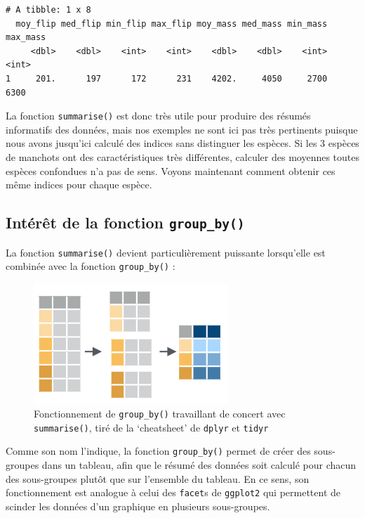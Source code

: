 \documentclass[
  a4paper,
  DIV=11,
  numbers=noendperiod,
  oneside]{scrreprt}
\begin{document}
\begin{verbatim}
# A tibble: 1 x 8
  moy_flip med_flip min_flip max_flip moy_mass med_mass min_mass max_mass
     <dbl>    <dbl>    <int>    <int>    <dbl>    <dbl>    <int>    <int>
1     201.      197      172      231    4202.     4050     2700     6300
\end{verbatim}

La fonction \texttt{summarise()} est donc très utile pour produire des
résumés informatifs des données, mais nos exemples ne sont ici pas très
pertinents puisque nous avons jusqu'ici calculé des indices sans
distinguer les espèces. Si les 3 espèces de manchots ont des
caractéristiques très différentes, calculer des moyennes toutes espèces
confondues n'a pas de sens. Voyons maintenant comment obtenir ces même
indices pour chaque espèce.

\hypertarget{intuxe9ruxeat-de-la-fonction-group_by}{%
\subsection{\texorpdfstring{Intérêt de la fonction
\texttt{group\_by()}}{Intérêt de la fonction group\_by()}}\label{intuxe9ruxeat-de-la-fonction-group_by}}

La fonction \texttt{summarise()} devient particulièrement puissante
lorsqu'elle est combinée avec la fonction \texttt{group\_by()} :

\begin{figure}

{\centering \includegraphics[width=0.65\textwidth,height=\textheight]{./images/groupby.png}

}

\caption{\label{fig-groupby}Fonctionnement de \texttt{group\_by()}
travaillant de concert avec \texttt{summarise()}, tiré de la
`cheatsheet' de \texttt{dplyr} et \texttt{tidyr}}

\end{figure}

Comme son nom l'indique, la fonction \texttt{group\_by()} permet de
créer des sous-groupes dans un tableau, afin que le résumé des données
soit calculé pour chacun des sous-groupes plutôt que sur l'ensemble du
tableau. En ce sens, son fonctionnement est analogue à celui des
\texttt{facet}s de \texttt{ggplot2} qui permettent de scinder les
données d'un graphique en plusieurs sous-groupes.
\end{document}
